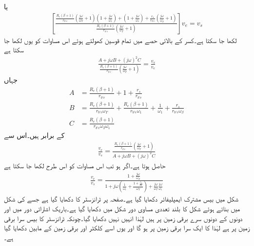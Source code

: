 یا
\begin{align*}
\left[\frac{\frac{R_e\left(\beta+1 \right)}{r_{b'e}} \left(\frac{j \omega}{\omega_T}+1 \right)\left(1+\frac{j \omega}{\omega_1}\right)+\left(1+\frac{j \omega}{\omega_1}\right)+\frac{r_s}{r_{b'e}}\left(\frac{j \omega}{\omega_{\beta}}+1\right)}{\frac{R_e\left(\beta+1 \right)}{r_{b'e}} \left(\frac{j \omega}{\omega_T}+1 \right)}\right] v_e=v_s
\end{align*}
لکھا جا سکتا ہے۔کسر کے بالائی حصے میں تمام قوسین کھولتے ہوئے اس مساوات کو یوں لکھا جا سکتا ہے
\begin{align*}
\frac{A+j \omega B +\left(j \omega \right)^2  C}{\frac{R_e\left(\beta+1 \right)}{r_{b'e}} \left(\frac{j \omega}{\omega_T}+1 \right)}=\frac{v_s}{v_e}
\end{align*}
جہاں
\begin{align*}
A&=\frac{R_e\left(\beta+1 \right)}{r_{b'e}}+1+\frac{r_s}{r_{b'e}}\\
B&=\frac{R_e\left(\beta+1 \right)}{r_{b'e} \omega_T} +\frac{R_e\left(\beta+1 \right)}{r_{b'e}\omega_1}+\frac{1}{\omega_1}+\frac{r_s}{r_{b'e}\omega_{\beta}}\\
C&=\frac{R_e\left(\beta+1 \right)}{r_{b'e} \omega_T \omega_1}
\end{align*}
کے برابر ہیں۔اس سے
\begin{align}
\frac{v_e}{v_s}=\frac{\frac{R_e\left(\beta+1 \right)}{r_{b'e}} \left(\frac{j \omega}{\omega_T}+1 \right)}{A+j \omega B +\left(j \omega \right)^2  C}
\end{align}
حاصل ہوتا ہے۔اگر   ہو تب اس مساوات کو اس طرح لکھا جا سکتا ہے
\begin{align}
\frac{v_e}{v_s}=\frac{1+\frac{j \omega}{\omega_T}}{1+j \omega \left(\frac{1}{\omega_1}+\frac{1+\frac{r_s}{R_e}}{\omega_T} \right)+\frac{j \omega}{\omega_T}\frac{j \omega}{\omega_1}}
\end{align}
شکل  میں بیس  مشترک ایمپلیفائر دکھایا گیا ہے۔صفحہ  پر ٹرانزسٹر کا  دکھایا گیا ہے جسے  کی شکل میں بناتے ہوئے شکل  کا بلند تعددی مساوی دور شکل  میں دکھایا گیا ہے۔باریک اشاراتی دور میں  اور  دونوں کے دونوں سرے برقی زمین پر ہیں لہٰذا انہیں نہیں دکھایا گیا۔چونکہ ٹرانزسٹر کا بیس  سرا برقی زمین پر ہے لہٰذا  کا ایک سرا برقی زمین پر ہو گا اور یوں اسے کلکٹر  اور برقی زمین کے مابین دکھایا گیا ہے۔ 

